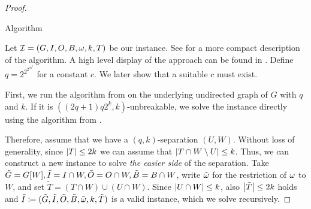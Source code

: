 \begin{theorem}
\begin{lemma}
\begin{theorem}
\begin{lemma}
\begin{reduction*}
\begin{reduction*}
\begin{reduction*}
\begin{reduction*}
\begin{lemma}
\begin{lemma}
\begin{theorem}
\begin{proof}
\begin{algorithm}[t]
 \label{alg:rec_und_scc}
   \caption{Algorithm \scsborder{}}
  \DontPrintSemicolon
\end{algorithm}

  Let $\mathcal{I} = (G, I, O, B, \operatorname{\omega}, k, T)$ be our \scsborder{} instance. See  for a more compact description of the algorithm. A high level display of the approach can be found in .
  Define $q = 2^{2^{2^{ck^2}}}$ for a constant $c$. We later show that a suitable $c$ must exist.

  First, we run the algorithm from  on the underlying undirected graph of $G$ with $q$ and $k$. If it is $((2q+1)q2^k, k)$-unbreakable, we solve the instance directly using the algorithm from .

  Therefore, assume that we have a $(q,k)$-separation $(U,W)$. Without loss of generality, since $\abs{T} \le 2k$ we can assume that $\abs{T \cap W \setminus U} \le k$. Thus, we can construct a new instance to solve \emph{the easier side} of the separation. Take $\tilde{G} = {G}[{W}], \tilde{I} = I \cap W, \tilde{O} = O \cap W, \tilde{B} = B \cap W$, write $\tilde{\operatorname{\omega}}$ for the restriction of $\operatorname{\omega}$ to $W$, and set $\tilde{T} = (T \cap W) \cup (U \cap W)$. Since $\abs{U \cap W} \le k$, also $\abs{\tilde{T}} \le 2k$ holds and $\tilde{I} \coloneqq (\tilde{G}, \tilde{I}, \tilde{O}, \tilde{B}, \tilde{\operatorname{\omega}}, k, \tilde{T})$ is a valid instance, which we solve recursively.


\end{proof}
\end{theorem}
\end{lemma}
\end{lemma}
\end{reduction*}
\end{reduction*}
\end{reduction*}
\end{reduction*}
\end{lemma}
\end{theorem}
\end{lemma}
\end{theorem}
